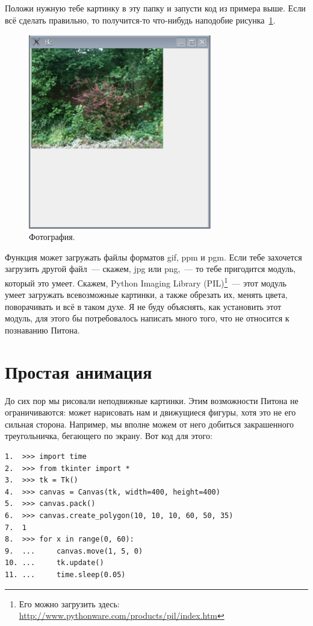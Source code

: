 Положи нужную тебе картинку в эту папку и запусти код из примера выше. Если всё сделать правильно, то получится-то что-нибудь наподобие рисунка \ref{fig43}.

\begin{figure}
\begin{center}
\includegraphics[width=80mm]{../en/figure43.eps}
\end{center}
\caption{Фотография.}\label{fig43}
\end{figure}

Функция  может загружать файлы форматов gif, ppm и pgm. Если тебе захочется загрузить другой файл — скажем, jpg или png, — то тебе пригодится модуль, который это умеет. Скажем, Python Imaging Library (PIL)\footnote{Его можно загрузить здесь: \url{http://www.pythonware.com/products/pil/index.htm}} — этот модуль  умеет загружать всевозможные картинки, а также обрезать их, менять цвета, поворачивать и всё в таком духе. Я не буду объяснять, как установить этот модуль, для этого бы потребовалось написать много того, что не относится к познаванию Питона.

\section{Простая анимация}

До сих пор мы рисовали неподвижные картинки. Этим возможности Питона не ограничиваются:  может нарисовать нам и движущиеся фигуры, хотя это не его сильная сторона. Например, мы вполне можем от него добиться закрашенного треугольничка, бегающего по экрану. Вот код для этого:

\begin{listing}
\begin{verbatim}
1.  >>> import time
2.  >>> from tkinter import *
3.  >>> tk = Tk()
4.  >>> canvas = Canvas(tk, width=400, height=400)
5.  >>> canvas.pack()
6.  >>> canvas.create_polygon(10, 10, 10, 60, 50, 35)
7.  1
8.  >>> for x in range(0, 60):
9.  ...     canvas.move(1, 5, 0)
10. ...     tk.update()
11. ...     time.sleep(0.05)
\end{verbatim}
\end{listing}

